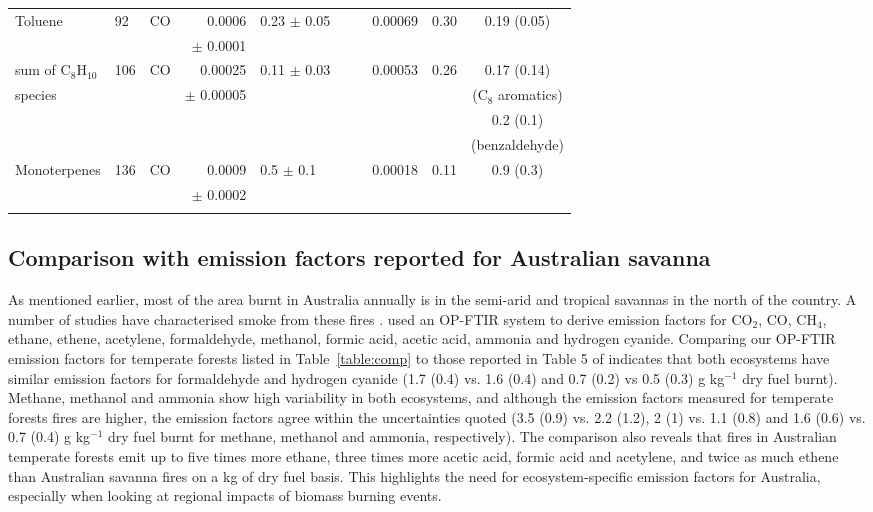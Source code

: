 \documentclass[acp, manuscript]{copernicus}
\begin{document}
\begin{supertabular}{l l l r l r l l l c}
  Toluene & 92 & CO & 0.0006 & 0.23 $\pm$ 0.05 & & &0.00069 &0.30 & 0.19 (0.05) \\ 
  &&&$\pm$ 0.0001&&&&&&\\
  sum of C$_8$H$_{10}$  & 106 & CO & 0.00025 & 0.11 $\pm$ 0.03 & & & 0.00053 & 0.26 & 0.17 (0.14)  \\
  species &&&$\pm$ 0.00005&&&&&  & (C$_8$ aromatics) \\
  &&&&&&&& &0.2 (0.1) \\
  &&&&&&&&&(benzaldehyde)\\
  Monoterpenes & 136 &CO & 0.0009 & 0.5 $\pm$ 0.1& & &0.00018 & 0.11 & 0.9 (0.3) \\
  &&&$\pm$ 0.0002&&&&&& \\
  \bottomhline
  \label{table:comp} 
  \belowtable{} &&&&&&&&&\\
\end{supertabular}

\subsection{Comparison with emission factors reported for Australian savanna}
As mentioned earlier, most of the area burnt in Australia annually is in the semi-arid and tropical savannas in the north of the country. A number of studies have characterised smoke from these fires \citep{Hurst1994a, Hurst1994,Hurst1996,Shirai2003,Paton-Walsh2010,Meyer2012,Smith2014, Desservettaz2017,  Wang2017b, Wang2017}. \citet{Smith2014} used an OP-FTIR system to derive emission factors for CO$_2$, CO, CH$_4$, ethane, ethene, acetylene, formaldehyde, methanol, formic acid, acetic acid, ammonia and hydrogen cyanide. Comparing our OP-FTIR emission factors for temperate forests listed in Table~\ref{table:comp} to those reported in Table 5 of \citet{Smith2014} indicates that both ecosystems have similar emission factors for formaldehyde and hydrogen cyanide (1.7 (0.4) vs. 1.6 (0.4) and 0.7 (0.2) vs 0.5 (0.3) g kg$^{-1}$ dry fuel burnt). Methane, methanol and ammonia show high variability in both ecosystems, and although the emission factors measured for temperate forests fires are higher, the emission factors agree within the uncertainties quoted (3.5 (0.9) vs. 2.2 (1.2),  2 (1) vs. 1.1 (0.8) and 1.6 (0.6) vs. 0.7 (0.4) g kg$^{-1}$ dry fuel burnt for methane, methanol and ammonia, respectively). The comparison also reveals that fires in Australian temperate forests emit up to five times more ethane, three times more acetic acid, formic acid and acetylene, and twice as much ethene than Australian savanna fires on a kg of dry fuel basis. This highlights the need for ecosystem-specific emission factors for Australia, especially when looking at regional impacts of biomass burning events. 
\end{document}
